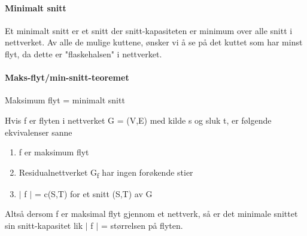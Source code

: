 \documentclass[12pt]{report}
\begin{document}
\paragraph*{Minimalt snitt}
Et minimalt snitt er et snitt der snitt-kapasiteten er minimum over alle snitt i nettverket. Av alle de mulige kuttene, ønsker vi å se på det kuttet som har minst flyt, da dette er "flaskehalsen" i nettverket.\par


\vspace{\baselineskip}
\paragraph*{Maks-flyt/min-snitt-teoremet}
Maksimum flyt = minimalt snitt\par

Hvis f er flyten i nettverket G = (V,E) med kilde s og sluk t, er følgende ekvivalenser sanne\par

\begin{enumerate}
	\item f er maksimum flyt\par

	\item Residualnettverket G\textsubscript{f} har ingen forøkende stier\par

	\item $ \vert $  f $ \vert $  = c(S,T) for et snitt (S,T) av G 
\end{enumerate}\par

Altså dersom f er maksimal flyt gjennom et nettverk, så er det minimale snittet sin snitt-kapasitet lik $ \vert $  f $ \vert $  = størrelsen på flyten. \par


\vspace{\baselineskip}

\vspace{\baselineskip}

\vspace{\baselineskip}

\vspace{\baselineskip}

\vspace{\baselineskip}

\vspace{\baselineskip}
\end{document}
